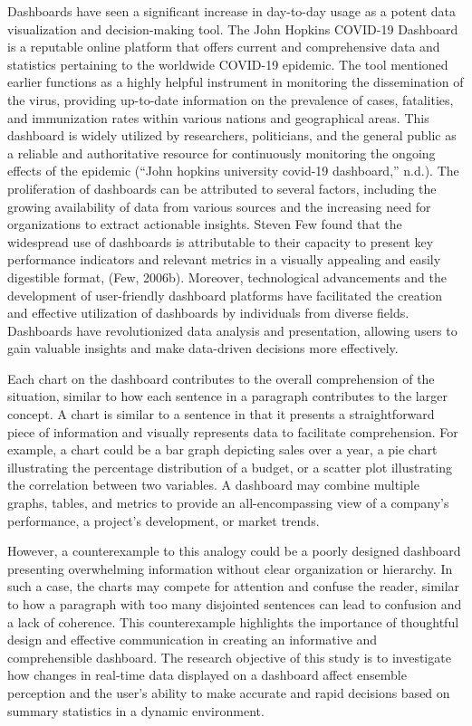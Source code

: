 \documentclass[print]{nuthesis}
\begin{document}
Dashboards have seen a significant increase in day-to-day usage as a potent data visualization and decision-making tool.
The John Hopkins COVID-19 Dashboard is a reputable online platform that offers current and comprehensive data and statistics pertaining to the worldwide COVID-19 epidemic.
The tool mentioned earlier functions as a highly helpful instrument in monitoring the dissemination of the virus, providing up-to-date information on the prevalence of cases, fatalities, and immunization rates within various nations and geographical areas.
This dashboard is widely utilized by researchers, politicians, and the general public as a reliable and authoritative resource for continuously monitoring the ongoing effects of the epidemic ({``John hopkins university covid-19 dashboard,''} n.d.).
The proliferation of dashboards can be attributed to several factors, including the growing availability of data from various sources and the increasing need for organizations to extract actionable insights.
Steven Few found that the widespread use of dashboards is attributable to their capacity to present key performance indicators and relevant metrics in a visually appealing and easily digestible format, (Few, 2006b).
Moreover, technological advancements and the development of user-friendly dashboard platforms have facilitated the creation and effective utilization of dashboards by individuals from diverse fields.
Dashboards have revolutionized data analysis and presentation, allowing users to gain valuable insights and make data-driven decisions more effectively.

Each chart on the dashboard contributes to the overall comprehension of the situation, similar to how each sentence in a paragraph contributes to the larger concept.
A chart is similar to a sentence in that it presents a straightforward piece of information and visually represents data to facilitate comprehension.
For example, a chart could be a bar graph depicting sales over a year, a pie chart illustrating the percentage distribution of a budget, or a scatter plot illustrating the correlation between two variables.
A dashboard may combine multiple graphs, tables, and metrics to provide an all-encompassing view of a company's performance, a project's development, or market trends.

However, a counterexample to this analogy could be a poorly designed dashboard presenting overwhelming information without clear organization or hierarchy.
In such a case, the charts may compete for attention and confuse the reader, similar to how a paragraph with too many disjointed sentences can lead to confusion and a lack of coherence.
This counterexample highlights the importance of thoughtful design and effective communication in creating an informative and comprehensible dashboard.
The research objective of this study is to investigate how changes in real-time data displayed on a dashboard affect ensemble perception and the user's ability to make accurate and rapid decisions based on summary statistics in a dynamic environment.
\end{document}
